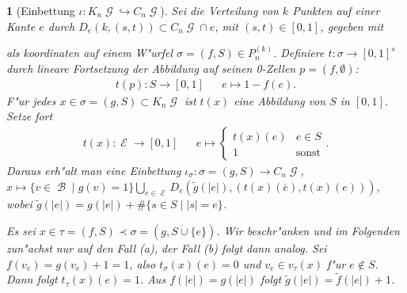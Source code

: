 \documentclass[paper=A4, twoside, chapterprefix=true, bibliography=totoc, headsepline]{scrbook}
\newcommand{\tikzgitter}[3][0.25]{ %
	\draw[step=#1,gray!15] #2 grid #3;
	\draw[step=2*#1,gray!30] #2 grid #3;
	\fill (0,0) circle(0.1); 
}
\DeclareMathOperator{\calB}{{\mathcal{B}}}
\DeclareMathOperator{\calE}{{\mathcal{E}}}
\DeclareMathOperator{\calG}{{\mathcal{G}}}
\newcommand{\E}{\calE}
\newcommand{\G}{\calG}
\theoremstyle{break}
\theoremstyle{nonumberbreak}
\theoremstyle{emptybreak}
\newtheorem{emptythm}{}%
\theoremstyle{break}
\begin{document}
\begin{emptythm}[Einbettung $\iota: K_n\G \hookrightarrow C_n\G$]
Sei die Verteilung von $k$ Punkten auf einer Kante $e$ durch $D_e(k, (s, t)) \subset C_n\G \cap e$, mit $(s,t) \in [0,1]$, gegeben mit
\begin{center}\end{center}
als koordinaten auf einem W"urfel $\sigma = (f,S) \in P_n^{(k)}$.
Definiere $t: \sigma \to [0,1]^s$ durch lineare Fortsetzung der Abbildung auf seinen 0-Zellen $p= (f, \emptyset)$:
\begin{align*}
	t(p): S \to [0,1] && e \mapsto 1 - f(e).
\end{align*}
F"ur jedes $x \in \sigma = (g,S) \subset K_n\G$ ist  $t(x)$ eine Abbildung von $S$ in $[0,1]$.
Setze fort
\begin{align*}
	t(x): \E \to [0,1] && e \mapsto \begin{cases} t(x)(e) & e \in S \\ 1 & \text{sonst} \end{cases}.
\end{align*}
Daraus erh"alt man eine Einbettung $\iota_\sigma: \sigma = (g, S) \to C_n\G$, $x \mapsto \{v \in \calB \mid g(v) = 1 \} \bigcup_{e \in \E} D_e(\tilde{g}(|e|), (t(x)(\overline e), t(x)(e)))$, wobei $\tilde{g}(|e|) = g(|e|) + \# \{s \in S \mid |s| = e \}$.

Es sei $x \in \tau = (f, S) \prec \sigma = (g, S \dot\cup \{e\})$.
Wir beschr"anken und im Folgenden zun"achst nur auf den Fall (a), der Fall (b) folgt dann analog.
Sei $f(v_e) = g(v_e) + 1 = 1$, also $t_\sigma(x)(e) = 0$ und $v_e \in v_\tau(x)$ f"ur $e \notin S$.
Dann folgt $t_\tau(x)(e) = 1$.
Aus $f(|e|) = g(|e|)$ folgt $\tilde{g}(|e|) = \tilde{f}(|e|) + 1$.


\end{emptythm}
\end{document}
